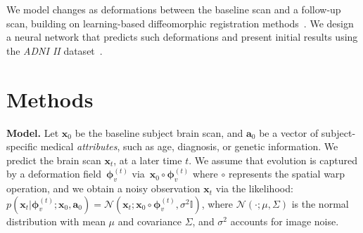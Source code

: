 \documentclass{midl} %
\newcommand{\bx}{\boldsymbol{x}}
\newcommand{\ba}{\boldsymbol{a}}
\newcommand{\N}{\mathcal{N}}
\newcommand{\bphi}{\boldsymbol{\phi}}
\begin{document}
We model changes as deformations between the baseline scan and a follow-up scan, building on learning-based diffeomorphic registration methods~\cite{balakrishnan2019voxelmorph, dalca2019unsupervised,de2017end,ashburner2007fast,dalca2019unsupervised,hernandez2009registration,yang2017quicksilver}. We design a neural network that predicts such deformations and present initial results using the \textit{ADNI II} dataset~\cite{mueller2005alzheimer}.%



\vspace{-0.3cm}
\section{Methods}
\vspace{-0.2cm}
\noindent\textbf{Model.} Let $\bx_{0}$ be the baseline subject brain scan, and $\ba_0$ be a vector of subject-specific medical \textit{attributes}, such as age, diagnosis, or genetic information. We predict the brain scan $\bx_t$, at a later time $t$. We assume that evolution is captured by a deformation field~$\bphi_v^{(t)}$ via~$\bx_0 \circ \bphi_v^{(t)} $ where $\circ$ represents the spatial warp operation, and we obtain a noisy observation $\bx_t$ via the likelihood: $p(\bx_t | \bphi_v^{(t)}; \bx_0, \ba_0) =  \N(\bx_t; \bx_0 \circ \bphi_v^{(t)}, \sigma^2 \mathbb{I})$, where $\mathcal{N}(\cdot; \mu, \Sigma)$ is the normal distribution with mean $\mu$ and covariance $\Sigma$, and $\sigma^2$ accounts for image noise. %
\end{document}
